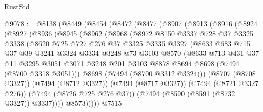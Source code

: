 \begin{lexlean}{RustStd}
\begin{coremodule}
@9078 := @8138
    (@8449
      (@8454
        (@8472
          (@8477
            (@8907
              (@8913
                (@8916
                  (@8924
                    (@8927
                      (@8936
                        (@8945
                          (@8962
                            (@8968
                              (@8972
                                @8150
                                @3337
                                @728
                                @37
                                @3325
                                @3338
                                (@8620
                                  @725
                                  @727
                                  @276
                                  @37
                                  @3325
                                  @3335
                                  @3327
                                  (@8633
                                    @683
                                    @715
                                    @37
                                    @39
                                    @3241
                                    @3324
                                    @3334
                                    @3248
                                    @73
                                    @3103
                                    @8570
                                    (@8633
                                      @713
                                      @431
                                      @37
                                      @11
                                      @3295
                                      @3051
                                      @3071
                                      @3248
                                      @201
                                      @3103
                                      @8878
                                      @8694
                                      @8698
                                      (@7494 (@8700 @3318 @3051)))
                                    @8698
                                    (@7494 (@8700 @3312 @3324)))
                                  (@8707 (@8708 @3327))
                                  (@7494 (@8712 @3327))
                                  (@7494 (@8717 @3327))
                                  (@7494 (@8721 @3327 @276))
                                  (@7494 (@8726 @725 @276 @37))
                                  (@7494 (@8590 (@8591 (@8732 @3327)) @3337))))
                              @8573)))))
                    @7515

\end{coremodule}
\end{lexlean}
